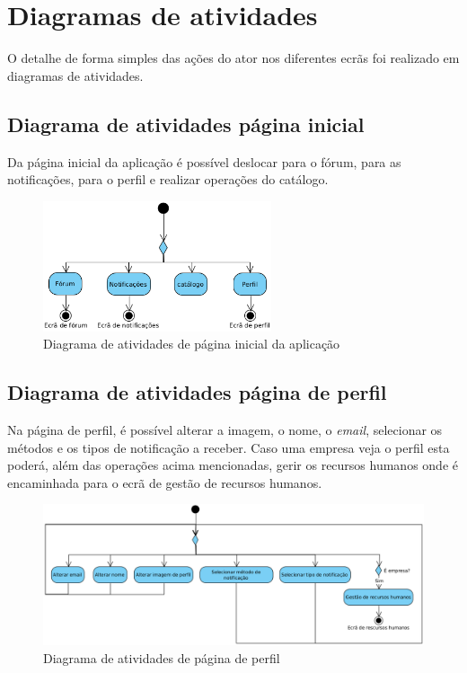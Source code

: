 \section{Diagramas de atividades}
O detalhe de forma simples das ações do ator nos diferentes ecrãs foi realizado em diagramas de atividades.

\subsection{Diagrama de atividades página inicial}

Da página inicial da aplicação é possível deslocar para o fórum, para as notificações, para o perfil e realizar operações do catálogo.

\begin{figure}[htb]
  \centering
  \includegraphics[width=0.6\textwidth]{images/diagramas/atividades/diagrama_atividades_home.png}
  \caption{Diagrama de atividades de página inicial da aplicação}
  \label{fig:34}
\end{figure}

\subsection{Diagrama de atividades página de perfil}

Na página de perfil, é possível alterar a imagem, o nome, o \textit{email}, selecionar os métodos e os tipos de notificação a receber. Caso uma empresa veja o perfil esta poderá, além das operações acima mencionadas, gerir os recursos humanos onde é encaminhada para o ecrã de gestão de recursos humanos.

\begin{figure}[htb]
  \centering
  \includegraphics[width=\textwidth]{images/diagramas/atividades/diagrama_atividades_perfil.png}
  \caption{Diagrama de atividades de página de perfil}
  \label{fig:35}
\end{figure}

